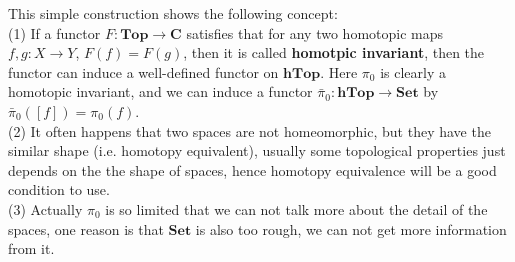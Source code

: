 This simple construction shows the following concept:\\

(1) If a functor \(F: \mathbf{Top} \to \mathbf{C}\) satisfies that for any two homotopic maps \(f,g:X \to Y\), \(F(f) = F(g)\), then it is called \textbf{homotpic invariant}, then the functor can induce a well-defined functor on \(\mathbf{hTop}\). Here \(\pi_0\) is clearly a homotopic invariant, and we can induce a functor \(\bar{\pi}_0: \mathbf{hTop} \to \mathbf{Set}\) by \(\bar{\pi}_0([f]) = \pi_0(f)\).\\

(2) It often happens that two spaces are not homeomorphic, but they have the similar shape (i.e. homotopy equivalent), usually some topological properties just depends on the the shape of spaces, hence homotopy equivalence will be a good condition to use.\\

(3) Actually \(\pi_0\) is so limited that we can not talk more about the detail of the spaces, one reason is that \(\mathbf{Set}\) is also too rough, we can not get more information from it.\\


